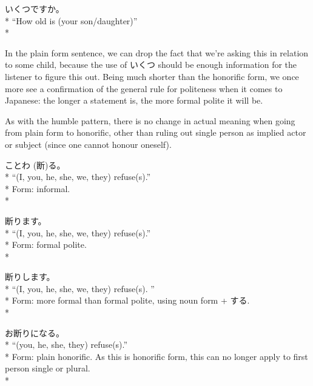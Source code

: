 \documentclass[11pt, b5paper, twoside, openright, onecolumn]{book}
\makeatletter
\newcommand*{\rubystack}[2]{{\relscale{0.5}%
  \begin{tabular}[b]{@{}c@{}}%
    {#1}\\%
   {\textscale{2}{#2}}%
  \end{tabular}}%
}
\DeclareRobustCommand*{\ruby}[2]{%
  \mbox{%
    \setlength{\parskip}{0ex}%
    \BeginAccSupp{method=pdfstringdef,ActualText={#1}}%
      \rubystack{\phantom{#2}}{#1}%
      \llap{%
        \rubystack{#2}{\phantom{#1}}%
      }%
    \EndAccSupp{}%
  }%
}
\renewcommand*{\ruby}[2]{#2 (#1)}%
\newenvironment{exampleblock}{
\setlength{\parindent}{0.6in}
\begin{minipage}[t]{\dimexpr\textwidth-\parindent}}
{\end{minipage}}
\makeatother
\begin{document}
\vspace{0.4cm}
\begin{exampleblock}
いくつですか。 \\* 
“How old is (your son/daughter)” \\* 
\end{exampleblock}
\vspace{0.2cm}

In the plain form sentence‚ we can drop the fact that we’re asking this in relation to some child‚ because the use of いくつ should be enough information for the listener to figure this out. Being much shorter than the honorific form‚ we once more see a confirmation of the general rule for politeness when it comes to Japanese: the longer a statement is‚ the more formal polite it will be.

As with the humble pattern‚ there is no change in actual meaning when going from plain form to honorific‚ other than ruling out single person as implied actor or subject (since one cannot honour oneself).

\vspace{0.4cm}
\begin{exampleblock}
\ruby{断}{ことわ}る。 \\* 
“(I‚ you‚ he‚ she‚ we‚ they) refuse(s).” \\* 
Form: informal. \\* 
\end{exampleblock}
\vspace{0.2cm}

\begin{exampleblock}
断ります。 \\* 
“(I‚ you‚ he‚ she‚ we‚ they) refuse(s).” \\* 
Form: formal polite. \\* 
\end{exampleblock}
\vspace{0.2cm}

\begin{exampleblock}
断りします。 \\* 
“(I‚ you‚ he‚ she‚ we‚ they) refuse(s). ” \\* 
Form: more formal than formal polite‚ using noun form + する. \\* 
\end{exampleblock}
\vspace{0.2cm}

\begin{exampleblock}
お断りになる。 \\* 
“(you‚ he‚ she‚ they) refuse(s).” \\* 
Form: plain honorific. As this is honorific form‚ this can no longer apply to first person single or plural. \\* 
\end{exampleblock}
\vspace{0.2cm}
\end{document}

